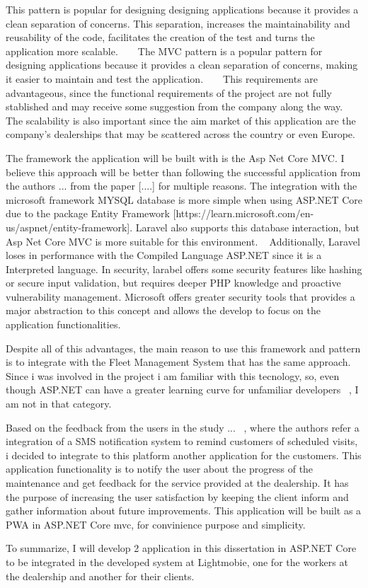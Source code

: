 This pattern is popular for designing designing applications because it provides a clean separation of concerns. This separation, increases the maintainability and reusability of the code, facilitates the creation of the test and turns the application more scalable. ~\cite{mvc_geeksforgeeks} ~\cite{MVC_StartupHouse}
The \ac{MVC} pattern is a popular pattern for designing applications because it provides a clean separation of concerns, making it easier to maintain and test the application. ~\cite{mvc_geeksforgeeks} ~\cite{MVC_StartupHouse}
This requirements are advantageous, since the functional requirements of the project are not fully stablished and may receive some suggestion from the company along the way. 
The scalability is also important since the aim market of this application are the company's dealerships that may be scattered across the country or even Europe.

The framework the application will be built with is the Asp Net Core MVC. 
I believe this approach will be better than following the successful application from the authors ... from the paper [....] for multiple reasons.
The integration with the microsoft framework MYSQL database is more simple when using ASP.NET Core due to the package Entity Framework [https://learn.microsoft.com/en-us/aspnet/entity-framework]. 
Laravel also supports this database interaction, but Asp Net Core MVC is more suitable for this environment. ~\cite{asp_net_vs_laravel}
Additionally, Laravel loses in performance with the Compiled Language ASP.NET since it is a Interpreted language. 
In security, larabel offers some security features like hashing or secure input validation, but requires deeper PHP knowledge and proactive vulnerability management. 
Microsoft offers greater security tools that provides a major abstraction to this concept and allows the develop to focus on the application functionalities. ~\cite{asp_net_vs_laravel}

Despite all of this advantages, the main reason to use this framework and pattern is to integrate with the Fleet Management System that has the same approach. 
Since i was involved in the project i am familiar with this tecnology, so, even though ASP.NET can have a greater learning curve for unfamiliar developers ~\cite{asp_net_vs_laravel}, I am not in that category.

Based on the feedback from the users in the study ... ~\cite{MARS_MOTORS}, where the authors refer a integration of a SMS notification system to remind customers of scheduled visits, i decided to integrate to this platform another application for the customers. 
This application functionality is to notify the user about the progress of the maintenance and get feedback for the service provided at the dealership.
It has the purpose of increasing the user satisfaction by keeping the client inform and gather information about future improvements.
This application will be built as a \ac{PWA} in ASP.NET Core mvc, for convinience purpose and simplicity.

To summarize, I will develop 2 application in this dissertation in ASP.NET Core to be integrated in the developed system at Lightmobie, one for the workers at the dealership and another for their clients.







